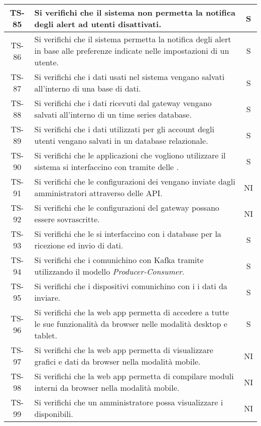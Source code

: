\begin{center}
\begin{longtable}{|c|p{10cm}|c|}
			 \hline
			 TS-85 & Si verifichi che il sistema non permetta la notifica degli alert ad utenti disattivati. & S \\
			 \hline
			 TS-86 & Si verifichi che il sistema permetta la notifica degli alert in base alle preferenze indicate nelle impostazioni di un utente. & S \\
			 \hline
			 TS-87 & Si verifichi che i dati usati nel sistema vengano salvati all'interno di una base di dati. & S \\
			 \hline
			 TS-88 & Si verifichi che i dati ricevuti dal gateway vengano salvati all'interno di un time series database. & S \\
			 \hline
			 TS-89 & Si verifichi che i dati utilizzati per gli account degli utenti vengano salvati in un database relazionale. & S \\
			 \hline
			 TS-90 & Si verifichi che le applicazioni che vogliono utilizzare il sistema si interfaccino con \glock{Kafka} tramite delle \glock{API}. & S \\
			 \hline
			 TS-91 & Si verifichi che le configurazioni dei \glock{gateway} vengano inviate dagli amministratori attraverso delle API. & NI \\
			 \hline
			 TS-92 & Si verifichi che le configurazioni del gateway possano essere sovrascritte. & NI \\
			 \hline
			 TS-93 & Si verifichi che le \glock{API} si interfaccino con i database per la ricezione ed invio di dati. & S \\
			 \hline
			 TS-94 & Si verifichi che i \glock{gateway} comunichino con Kafka tramite \glock{topic} utilizzando il modello \textit{Producer-Consumer}. & S \\
			 \hline
			 TS-95 & Si verifichi che i dispositivi comunichino con i \glock{gateway} i dati da inviare. & S \\
			 \hline
			 TS-96 & Si verifichi che la web app permetta di accedere a tutte le sue funzionalità da browser nelle modalità desktop e tablet. & S \\
			 \hline
			 TS-97 & Si verifichi che la web app permetta di visualizzare grafici e dati da browser nella modalità mobile. & NI \\
			 \hline
			 TS-98 & Si verifichi che la web app permetta di compilare moduli interni da browser nella modalità mobile. & NI \\
			 \hline
			 TS-99 & Si verifichi che un amministratore possa visualizzare i \glock{gateway} disponibili. & NI \\

\end{longtable}
\end{center}
